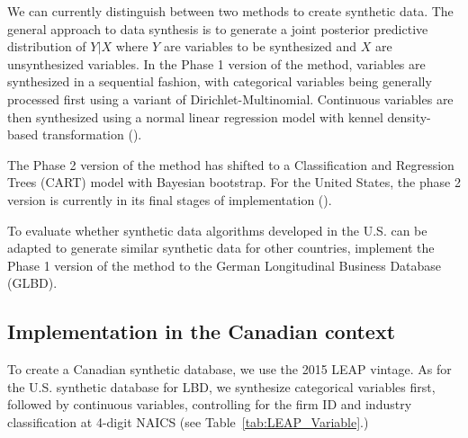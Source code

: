We can currently distinguish between two methods to create synthetic data. The general approach to data synthesis is to generate a joint posterior predictive distribution of $Y|X$ where $Y$ are variables to be synthesized and $X$ are unsynthesized variables. In the Phase 1 version of the method, variables are synthesized in a sequential fashion, with categorical variables being generally processed first using a variant of Dirichlet-Multinomial. Continuous variables are then synthesized using a normal linear regression model with kennel density-based transformation (\textcite{WOODCOCK20094228}). 

The Phase 2 version of the method has shifted to a Classification and Regression Trees (CART) model with Bayesian bootstrap. For the United States, the phase 2 version  is currently in its final stages of implementation (\textcite{RePEc:cen:wpaper:14-12}). 

To evaluate whether synthetic data algorithms developed in the U.S. can be adapted to generate similar synthetic data for other countries, \textcite{RePEc:cen:wpaper:14-13} implement the Phase 1 version of the method to the German Longitudinal Business Database (GLBD). 

\subsection{Implementation in the Canadian context}

To create a Canadian synthetic database, we use the 2015 LEAP vintage. As for the U.S. synthetic database for LBD,  we synthesize categorical variables first, followed by continuous variables, controlling for the firm ID and industry classification at 4-digit NAICS (see Table~\ref{tab:LEAP_Variable}.)



